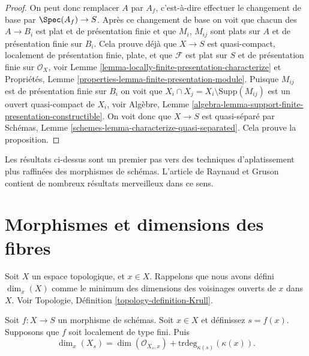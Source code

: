 \begin{proof}
\medskip\noindent
On peut donc remplacer $A$ par
$A_f$, c'est-à-dire effectuer le changement
de base par $\Spec(A_f) \to S$. Après ce changement de
base on voit que chacun des $A \to B_i$ est plat et de présentation finie
et que $M_i$, $M_{ij}$ sont
plats sur $A$ et de présentation finie sur
$B_i$. Cela prouve déjà que $X \to S$ est quasi-compact,
localement de présentation finie, plate, et que $\mathcal{F}$
est plat sur $S$ et de présentation finie sur
$\mathcal{O}_X$,
voir Lemme \ref{lemma-locally-finite-presentation-characterize} et Propriétés, Lemme \ref{properties-lemma-finite-presentation-module}.
Puisque $M_{ij}$ est de présentation finie
sur $B_i$ on voit que $X_i \cap X_j = X_i \setminus \text{Supp}(M_{ij})$ est un ouvert
quasi-compact
de $X_i$, voir Algèbre, Lemme \ref{algebra-lemma-support-finite-presentation-constructible}. On voit
donc que $X \to S$ est quasi-séparé
par Schémas, Lemme \ref{schemes-lemma-characterize-quasi-separated}. Cela prouve
la proposition.
\end{proof}









\begin{remark}
\label{remark-flattening}
Les résultats ci-dessus sont un premier pas vers des techniques d'aplatissement plus raffinées
des morphismes de schémas. L'article \cite{GruRay} de Raynaud et Gruson contient
de nombreux résultats merveilleux dans ce sens.
\end{remark}







\section{Morphismes et dimensions des fibres}
\label{section-dimension-fibres}

\noindent
Soit $X$ un espace topologique, et $x \in X$.
Rappelons que nous avons défini $\dim_x(X)$ comme le minimum
des dimensions des voisinages ouverts de $x$
dans $X$. Voir Topologie, Définition \ref{topology-definition-Krull}.

\begin{lemma}
\label{lemma-dimension-fibre-at-a-point}
Soit $f : X \to S$ un morphisme de schémas. Soit $x \in X$
et définissez $s = f(x)$. Supposons
que $f$ soit localement de type fini.
Puis
$$
\dim_x(X_s) =
\dim(\mathcal{O}_{X_s, x}) + \text{trdeg}_{\kappa(s)}(\kappa(x)).
$$
\end{lemma}

